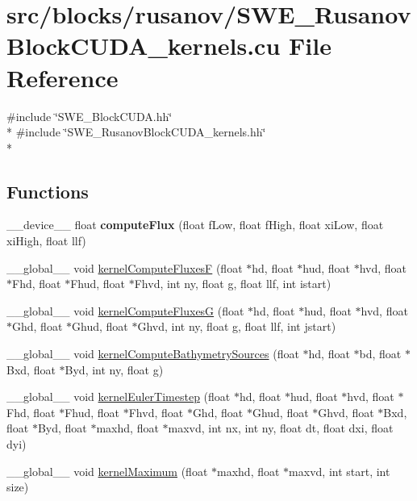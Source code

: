 \hypertarget{SWE__RusanovBlockCUDA__kernels_8cu}{\section{src/blocks/rusanov/\-S\-W\-E\-\_\-\-Rusanov\-Block\-C\-U\-D\-A\-\_\-kernels.cu File Reference}
\label{SWE__RusanovBlockCUDA__kernels_8cu}
}
{\ttfamily \#include \char`\"{}S\-W\-E\-\_\-\-Block\-C\-U\-D\-A.\-hh\char`\"{}}\\*
{\ttfamily \#include \char`\"{}S\-W\-E\-\_\-\-Rusanov\-Block\-C\-U\-D\-A\-\_\-kernels.\-hh\char`\"{}}\\*
\subsection*{Functions}
\begin{DoxyCompactItemize}
\item 
\hypertarget{SWE__RusanovBlockCUDA__kernels_8cu_a26703ba88a0700f0ce24183c3a9bb81f}{\-\_\-\-\_\-device\-\_\-\-\_\- float {\bfseries compute\-Flux} (float f\-Low, float f\-High, float xi\-Low, float xi\-High, float llf)}\label{SWE__RusanovBlockCUDA__kernels_8cu_a26703ba88a0700f0ce24183c3a9bb81f}

\item 
\-\_\-\-\_\-global\-\_\-\-\_\- void \hyperlink{SWE__RusanovBlockCUDA__kernels_8cu_a125f373796424316bc49a0eb60f5f90e}{kernel\-Compute\-Fluxes\-F} (float $\ast$hd, float $\ast$hud, float $\ast$hvd, float $\ast$Fhd, float $\ast$Fhud, float $\ast$Fhvd, int ny, float g, float llf, int istart)
\item 
\-\_\-\-\_\-global\-\_\-\-\_\- void \hyperlink{SWE__RusanovBlockCUDA__kernels_8cu_a4a5d67e82c837347e337904d4c17cc07}{kernel\-Compute\-Fluxes\-G} (float $\ast$hd, float $\ast$hud, float $\ast$hvd, float $\ast$Ghd, float $\ast$Ghud, float $\ast$Ghvd, int ny, float g, float llf, int jstart)
\item 
\-\_\-\-\_\-global\-\_\-\-\_\- void \hyperlink{SWE__RusanovBlockCUDA__kernels_8cu_aa7530530448af30119436099351cfead}{kernel\-Compute\-Bathymetry\-Sources} (float $\ast$hd, float $\ast$bd, float $\ast$Bxd, float $\ast$Byd, int ny, float g)
\item 
\-\_\-\-\_\-global\-\_\-\-\_\- void \hyperlink{SWE__RusanovBlockCUDA__kernels_8cu_a105ff13519fe40ec2acbc182d5584a07}{kernel\-Euler\-Timestep} (float $\ast$hd, float $\ast$hud, float $\ast$hvd, float $\ast$Fhd, float $\ast$Fhud, float $\ast$Fhvd, float $\ast$Ghd, float $\ast$Ghud, float $\ast$Ghvd, float $\ast$Bxd, float $\ast$Byd, float $\ast$maxhd, float $\ast$maxvd, int nx, int ny, float dt, float dxi, float dyi)
\item 
\-\_\-\-\_\-global\-\_\-\-\_\- void \hyperlink{SWE__RusanovBlockCUDA__kernels_8cu_ae810017f0a27a38e1c5d78c7130e8ab4}{kernel\-Maximum} (float $\ast$maxhd, float $\ast$maxvd, int start, int size)
\end{DoxyCompactItemize}


